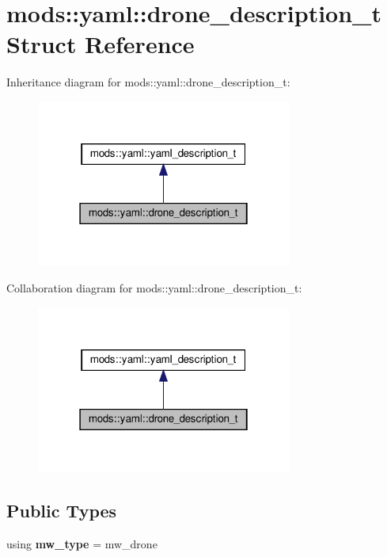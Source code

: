 \hypertarget{structmods_1_1yaml_1_1drone__description__t}{}\section{mods\+:\+:yaml\+:\+:drone\+\_\+description\+\_\+t Struct Reference}
\label{structmods_1_1yaml_1_1drone__description__t}


Inheritance diagram for mods\+:\+:yaml\+:\+:drone\+\_\+description\+\_\+t\+:\nopagebreak
\begin{figure}[H]
\begin{center}
\leavevmode
\includegraphics[width=238pt]{structmods_1_1yaml_1_1drone__description__t__inherit__graph}
\end{center}
\end{figure}


Collaboration diagram for mods\+:\+:yaml\+:\+:drone\+\_\+description\+\_\+t\+:\nopagebreak
\begin{figure}[H]
\begin{center}
\leavevmode
\includegraphics[width=238pt]{structmods_1_1yaml_1_1drone__description__t__coll__graph}
\end{center}
\end{figure}
\subsection*{Public Types}
\begin{DoxyCompactItemize}
\item 
\mbox{\label{structmods_1_1yaml_1_1drone__description__t_a2d4d810103913975aac20e0b00374d29}} 
using {\bfseries mw\+\_\+type} = mw\+\_\+drone
\end{DoxyCompactItemize}
